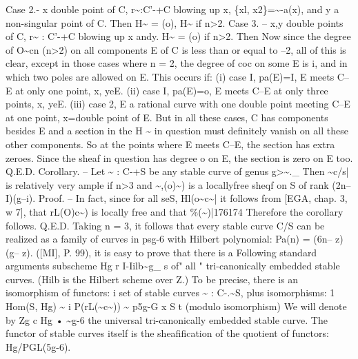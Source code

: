 \documentclass[11pt]{article}
\theoremstyle{plain}
\theoremstyle{definition}
\theoremstyle{remark}
\begin{document}
Case 2.- x double point of C, r\textasciitilde{}:C'-+C blowing up x, \{xl, x2\}=\textasciitilde{}-a(x), and y a non-singular point of C. Then H\textasciitilde{} = (o), H\textasciitilde{} if n>2. Case 3. -- x,y double points of C, r\textasciitilde{} : C'-+C blowing up x andy. H\textasciitilde{} = (o) if n>2. Then Now since the degree of O\textasciitilde{}cn (n>2) on all components E of C is less than or equal to --2, all of this is clear, except in those cases where n = 2, the degree of coc on some E is i, and in which two poles are allowed on E. This occurs if: (i) case I, pa(E)=I, E meets C--E at only one point, x, yeE. (ii) case I, pa(E)=o, E meets C--E at only three points, x, yeE. (iii) case 2, E a rational curve with one double point meeting C--E at one point, x=double point of E. But in all these cases, C has components besides E and a section in the H \textasciitilde{} in question must definitely vanish on all these other components. So at the points where E meets C--E, the section has extra zeroes. Since the sheaf in question has degree o on E, the section is zero on E too. Q.E.D. Corollary. -- Let \textasciitilde{} : C-+S be any stable curve of genus g>\textasciitilde{}.\_ Then \textasciitilde{}c/s| is relatively very ample if n>3 and \textasciitilde{},(o)\textasciitilde{}) is a locallyfree sheqf on S of rank (2n--I)(g--i). Proof. -- In fact, since for all seS, Hl(o\textasciitilde{}c\textasciitilde{}| it follows from [EGA, chap. 3, w 7], that rL(O)c\textasciitilde{}) is locally free and that \%(\textasciitilde{})|176174 Therefore the corollary follows. Q.E.D. Taking n = 3, it follows that every stable curve C/S can be realized as a family of curves in psg-6 with Hilbert polynomial: Pa(n) = (6n-- z)(g-- z). ([MI], P. 99), it is easy to prove that there is a Following standard arguments subscheme Hg r I-Iilb\textasciitilde{}g\_ s of" all " tri-canonically embedded stable curves. (Hilb is the Hilbert scheme over Z.) To be precise, there is an isomorphism of functors: i set of stable curves \textasciitilde{} : C-.\textasciitilde{}S, plus isomorphisms: 1 Hom(S, Hg) \textasciitilde{} i P(rL(\textasciitilde{}c\textasciitilde{})) \textasciitilde{} p5g-G x S t (modulo isomorphism) We will denote by Zg c Hg • \textasciitilde{}g-6 the universal tri-canonically embedded stable curve. The functor of stable curves itself is the sheafification of the quotient of functors: Hg/PGL(5g-6).
\end{document}
